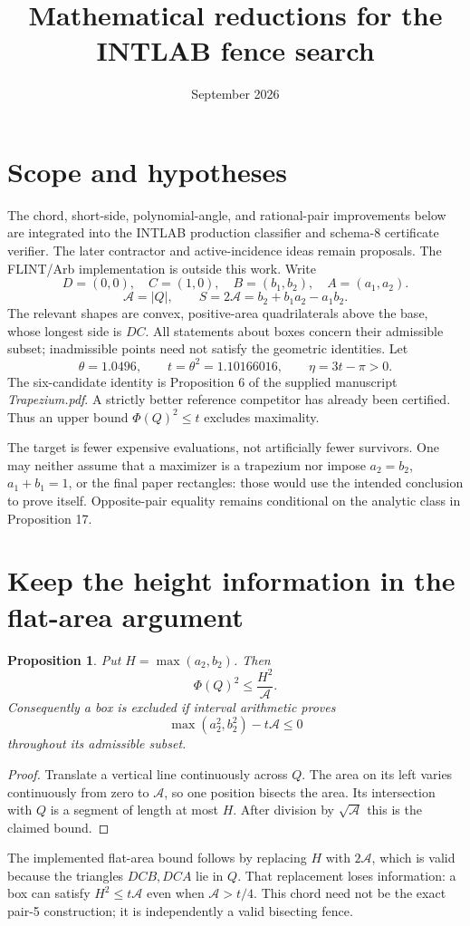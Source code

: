 \documentclass[11pt]{article}
\title{Mathematical reductions for the INTLAB fence search}
\author{}
\date{September 2026}
\newtheorem{proposition}{Proposition}
\newcommand{\Area}{\mathcal A}
\newcommand{\PhiQ}{\Phi(Q)}
\begin{document}
\maketitle

\section{Scope and hypotheses}
The chord, short-side, polynomial-angle, and rational-pair improvements below
are integrated into the INTLAB production classifier and schema-8 certificate
verifier. The later contractor and active-incidence ideas remain proposals.
The FLINT/Arb implementation is outside this work.
Write
\[
 D=(0,0),\quad C=(1,0),\quad B=(b_1,b_2),\quad A=(a_1,a_2).
\]
\[
 \Area=|Q|,\qquad S=2\Area=b_2+b_1a_2-a_1b_2.
\]
The relevant shapes are convex, positive-area quadrilaterals above the base,
whose longest side is \(DC\). All statements about boxes concern their
admissible subset; inadmissible points need not satisfy the geometric identities.
Let
\[
 \theta=1.0496,\qquad t=\theta^2=1.10166016,\qquad
 \eta=3t-\pi>0.
\]
The six-candidate identity is Proposition 6 of the supplied manuscript
\emph{Trapezium.pdf}. A strictly better reference competitor has already been
certified. Thus an upper bound \(\PhiQ^2\le t\) excludes maximality.

The target is fewer expensive evaluations, not artificially fewer survivors.
One may neither assume that a maximizer is a trapezium nor impose
\(a_2=b_2\), \(a_1+b_1=1\), or the final paper rectangles: those would use
the intended conclusion to prove itself. Opposite-pair equality remains
conditional on the analytic class in Proposition 17.

\section{Keep the height information in the flat-area argument}
\begin{proposition}
Put \(H=\max(a_2,b_2)\). Then
\[
 \PhiQ^2\le \frac{H^2}{\Area}.
\]
Consequently a box is excluded if interval arithmetic proves
\[
 \max(a_2^2,b_2^2)-t\Area\le0
\]
throughout its admissible subset.
\end{proposition}
\begin{proof}
Translate a vertical line continuously across \(Q\). The area on its left
varies continuously from zero to \(\Area\), so one position bisects the area.
Its intersection with \(Q\) is a segment of length at most \(H\).
After division by \(\sqrt{\Area}\) this is the claimed bound.
\end{proof}
The implemented flat-area bound follows by replacing \(H\) with
\(2\Area\), which is valid because the triangles \(DCB,DCA\) lie in \(Q\).
That replacement loses information: a box can satisfy \(H^2\le t\Area\)
even when \(\Area>t/4\).
This chord need not be the exact pair-5 construction; it is independently a
valid bisecting fence.
\end{document}
